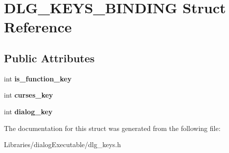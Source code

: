 \hypertarget{struct_d_l_g___k_e_y_s___b_i_n_d_i_n_g}{}\section{D\+L\+G\+\_\+\+K\+E\+Y\+S\+\_\+\+B\+I\+N\+D\+I\+NG Struct Reference}
\label{struct_d_l_g___k_e_y_s___b_i_n_d_i_n_g}
\subsection*{Public Attributes}
\begin{DoxyCompactItemize}
\item 
int {\bfseries is\+\_\+function\+\_\+key}\hypertarget{struct_d_l_g___k_e_y_s___b_i_n_d_i_n_g_ac958ff300f48898c136468aa66619e83}{}\label{struct_d_l_g___k_e_y_s___b_i_n_d_i_n_g_ac958ff300f48898c136468aa66619e83}

\item 
int {\bfseries curses\+\_\+key}\hypertarget{struct_d_l_g___k_e_y_s___b_i_n_d_i_n_g_a1a8689d859ba774610296b23c8470d25}{}\label{struct_d_l_g___k_e_y_s___b_i_n_d_i_n_g_a1a8689d859ba774610296b23c8470d25}

\item 
int {\bfseries dialog\+\_\+key}\hypertarget{struct_d_l_g___k_e_y_s___b_i_n_d_i_n_g_a942c69ee95f3d96774ebdaa313158661}{}\label{struct_d_l_g___k_e_y_s___b_i_n_d_i_n_g_a942c69ee95f3d96774ebdaa313158661}

\end{DoxyCompactItemize}


The documentation for this struct was generated from the following file\+:\begin{DoxyCompactItemize}
\item 
Libraries/dialog\+Executable/dlg\+\_\+keys.\+h\end{DoxyCompactItemize}
